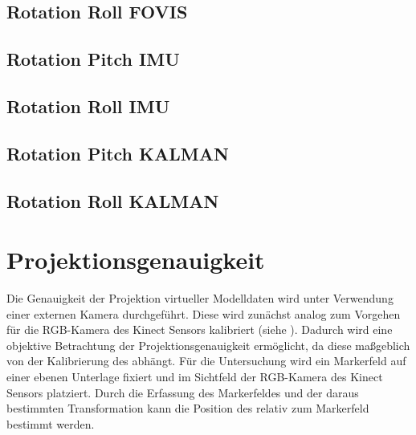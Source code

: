 \subsection{Rotation Roll FOVIS}

\subsection{Rotation Pitch IMU}

\subsection{Rotation Roll IMU}

\subsection{Rotation Pitch KALMAN}

\subsection{Rotation Roll KALMAN}


\section{Projektionsgenauigkeit}
Die Genauigkeit der Projektion virtueller Modelldaten wird unter Verwendung einer externen Kamera durchgeführt. Diese wird zunächst analog zum Vorgehen für die RGB-Kamera des Kinect Sensors kalibriert (siehe ). Dadurch wird eine objektive Betrachtung der Projektionsgenauigkeit ermöglicht, da diese maßgeblich von der Kalibrierung des  abhängt. Für die Untersuchung wird ein Markerfeld auf einer ebenen Unterlage fixiert und im Sichtfeld der RGB-Kamera des Kinect Sensors platziert. Durch die Erfassung des Markerfeldes und der daraus bestimmten Transformation kann die Position des  relativ zum Markerfeld bestimmt werden.\\

